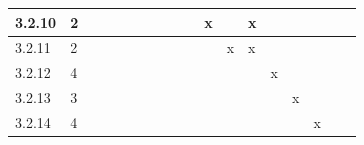 \documentclass[runningheads,a4paper]{article}
\begin{document}
\begin{table}[]
\begin{tabular}{llllllllllllllllll}
\multicolumn{1}{|l|}{3.2.10}       & \multicolumn{1}{l|}{2}        & \multicolumn{1}{l|}{}    & \multicolumn{1}{l|}{}    & \multicolumn{1}{l|}{}    & \multicolumn{1}{l|}{}    & \multicolumn{1}{l|}{}    & \multicolumn{1}{l|}{}    & \multicolumn{1}{l|}{}    & \multicolumn{1}{l|}{}    & \multicolumn{1}{l|}{x}   & \multicolumn{1}{l|}{}     & \multicolumn{1}{l|}{x}    & \multicolumn{1}{l|}{}     & \multicolumn{1}{l|}{}     & \multicolumn{1}{l|}{}     & \multicolumn{1}{l|}{}     & \multicolumn{1}{l|}{}     \\ \hline
\multicolumn{1}{|l|}{3.2.11}       & \multicolumn{1}{l|}{2}        & \multicolumn{1}{l|}{}    & \multicolumn{1}{l|}{}    & \multicolumn{1}{l|}{}    & \multicolumn{1}{l|}{}    & \multicolumn{1}{l|}{}    & \multicolumn{1}{l|}{}    & \multicolumn{1}{l|}{}    & \multicolumn{1}{l|}{}    & \multicolumn{1}{l|}{}    & \multicolumn{1}{l|}{x}    & \multicolumn{1}{l|}{x}    & \multicolumn{1}{l|}{}     & \multicolumn{1}{l|}{}     & \multicolumn{1}{l|}{}     & \multicolumn{1}{l|}{}     & \multicolumn{1}{l|}{}     \\ \hline
\multicolumn{1}{|l|}{3.2.12}       & \multicolumn{1}{l|}{4}        & \multicolumn{1}{l|}{}    & \multicolumn{1}{l|}{}    & \multicolumn{1}{l|}{}    & \multicolumn{1}{l|}{}    & \multicolumn{1}{l|}{}    & \multicolumn{1}{l|}{}    & \multicolumn{1}{l|}{}    & \multicolumn{1}{l|}{}    & \multicolumn{1}{l|}{}    & \multicolumn{1}{l|}{}     & \multicolumn{1}{l|}{}     & \multicolumn{1}{l|}{x}    & \multicolumn{1}{l|}{}     & \multicolumn{1}{l|}{}     & \multicolumn{1}{l|}{}     & \multicolumn{1}{l|}{}     \\ \hline
\multicolumn{1}{|l|}{3.2.13}       & \multicolumn{1}{l|}{3}        & \multicolumn{1}{l|}{}    & \multicolumn{1}{l|}{}    & \multicolumn{1}{l|}{}    & \multicolumn{1}{l|}{}    & \multicolumn{1}{l|}{}    & \multicolumn{1}{l|}{}    & \multicolumn{1}{l|}{}    & \multicolumn{1}{l|}{}    & \multicolumn{1}{l|}{}    & \multicolumn{1}{l|}{}     & \multicolumn{1}{l|}{}     & \multicolumn{1}{l|}{}     & \multicolumn{1}{l|}{x}    & \multicolumn{1}{l|}{}     & \multicolumn{1}{l|}{}     & \multicolumn{1}{l|}{}     \\ \hline
\multicolumn{1}{|l|}{3.2.14}       & \multicolumn{1}{l|}{4}        & \multicolumn{1}{l|}{}    & \multicolumn{1}{l|}{}    & \multicolumn{1}{l|}{}    & \multicolumn{1}{l|}{}    & \multicolumn{1}{l|}{}    & \multicolumn{1}{l|}{}    & \multicolumn{1}{l|}{}    & \multicolumn{1}{l|}{}    & \multicolumn{1}{l|}{}    & \multicolumn{1}{l|}{}     & \multicolumn{1}{l|}{}     & \multicolumn{1}{l|}{}     & \multicolumn{1}{l|}{}     & \multicolumn{1}{l|}{x}    & \multicolumn{1}{l|}{}     & \multicolumn{1}{l|}{}     \\ \hline

\end{tabular}
\end{table}
\end{document}

